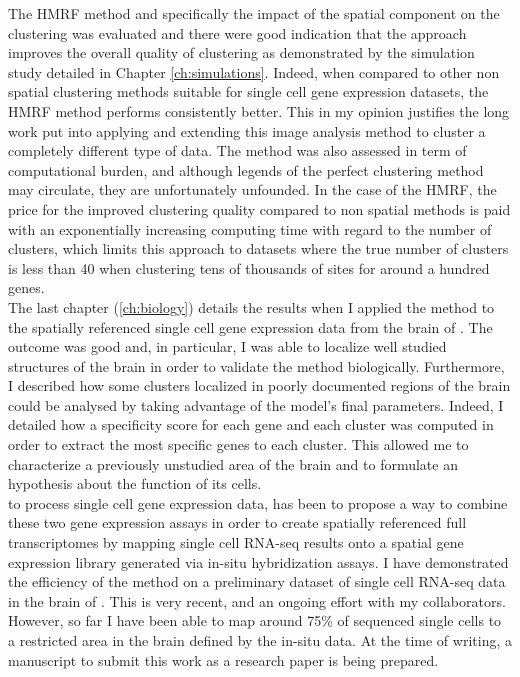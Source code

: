  The HMRF method and specifically the impact of the spatial component on the clustering was evaluated and there were good indication that the approach improves the overall quality of clustering as demonstrated by the simulation study detailed in Chapter \ref{ch:simulations}. Indeed, when compared to other non spatial clustering methods suitable for single cell gene expression datasets, the HMRF method performs consistently better. This in my opinion justifies the long work put into applying and extending this image analysis method to cluster a completely different type of data. The method was also assessed in term of computational burden, and although legends of the perfect clustering method may circulate, they are unfortunately unfounded. In the case of the HMRF, the price for the improved clustering quality compared to non spatial methods is paid with an exponentially increasing computing time with regard to the number of clusters, which limits this approach to datasets where the true number of clusters is less than 40 when clustering tens of thousands of sites for around a hundred genes. \\
 
 The last chapter (\ref{ch:biology}) details the results when I applied the method to the spatially referenced single cell gene expression data from the brain of \platyfull{}. The outcome was good and, in particular, I was able to localize well studied structures of the brain in order to validate the method biologically. Furthermore, I described how some clusters localized in poorly documented regions of the brain could be analysed by taking advantage of the model's final parameters. Indeed, I detailed how a specificity score for each gene and each cluster was computed in order to extract the most specific genes to each cluster. This allowed me to characterize a previously unstudied area of the brain and to formulate an hypothesis about the function of its cells. \\
 
 to process single cell gene expression data, has been to propose a way to combine these two gene expression assays in order to create spatially referenced full transcriptomes by mapping single cell RNA-seq results onto a spatial gene expression library generated via in-situ hybridization assays. I have demonstrated the efficiency of the method on a preliminary dataset of single cell RNA-seq data in the brain of \platy{}. This is very recent, and an ongoing effort with my collaborators. However, so far I have been able to map around 75\% of sequenced single cells to a restricted area in the brain defined by the in-situ data. At the time of writing, a manuscript to submit this work as a research paper is being prepared.\\

